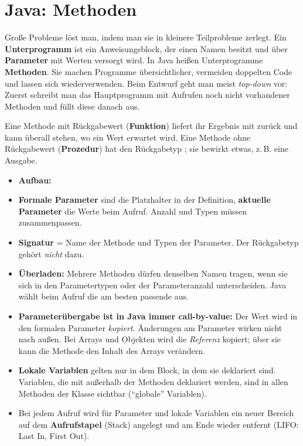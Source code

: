 \section{Java: Methoden}
\worum
Große Probleme löst man, indem man sie in kleinere Teilprobleme zerlegt. Ein \textbf{Unterprogramm} ist ein Anweisungsblock, der einen Namen besitzt und über \textbf{Parameter} mit Werten versorgt wird. In Java heißen Unterprogramme \textbf{Methoden}. Sie machen Programme übersichtlicher, vermeiden doppelten Code und lassen sich wiederverwenden. Beim Entwurf geht man meist \emph{top-down} vor: Zuerst schreibt man das Hauptprogramm mit Aufrufen noch nicht vorhandener Methoden und füllt diese danach aus.

Eine Methode mit Rückgabewert (\textbf{Funktion}) liefert ihr Ergebnis mit  zurück und kann überall stehen, wo ein Wert erwartet wird. Eine Methode ohne Rückgabewert (\textbf{Prozedur}) hat den Rückgabetyp ; sie bewirkt etwas, z.\,B. eine Ausgabe.

\begin{merke}
\begin{itemize}[itemsep=0.1em]
\item \textbf{Aufbau:} \ 
\item \textbf{Formale Parameter} sind die Platzhalter in der Definition, \textbf{aktuelle Parameter} die Werte beim Aufruf. Anzahl und Typen müssen zusammenpassen.
\item \textbf{Signatur} = Name der Methode und Typen der Parameter. Der Rückgabetyp gehört \emph{nicht} dazu.
\item \textbf{Überladen:} Mehrere Methoden dürfen denselben Namen tragen, wenn sie sich in den Parametertypen oder der Parameteranzahl unterscheiden. Java wählt beim Aufruf die am besten passende aus.
\item \textbf{Parameterübergabe ist in Java immer call-by-value:} Der Wert wird in den formalen Parameter \emph{kopiert}. Änderungen am Parameter wirken nicht nach außen. Bei Arrays und Objekten wird die \emph{Referenz} kopiert; über sie kann die Methode den Inhalt des Arrays verändern.
\item \textbf{Lokale Variablen} gelten nur in dem Block, in dem sie deklariert sind. Variablen, die mit  außerhalb der Methoden deklariert werden, sind in allen Methoden der Klasse sichtbar (\enquote{globale} Variablen).
\item Bei jedem Aufruf wird für Parameter und lokale Variablen ein neuer Bereich auf dem \textbf{Aufrufstapel} (Stack) angelegt und am Ende wieder entfernt (LIFO: Last In, First Out).
\end{itemize}
\end{merke}

